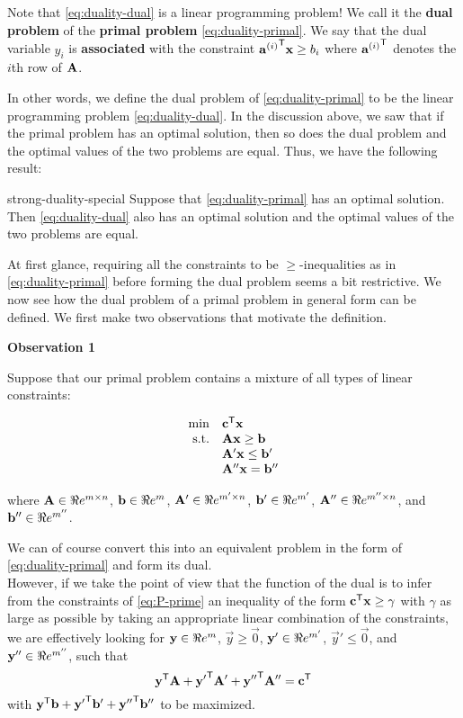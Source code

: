 Note that \eqref{eq:duality-dual} is a linear programming problem! We call
it the \textbf{dual problem} of the \textbf{primal problem}
\eqref{eq:duality-primal}. We say that the dual variable \(y_i\) is
\textbf{associated} with the constraint
\({\mathbf{a}^{(i)}}^{\mathsf{T}} \mathbf{x} \geq b_i\) where \({\mathbf{a}^{(i)}}^{\mathsf{T}}\)
denotes the \(i\)th row of \(\mathbf{A}\).

In other words, we define the dual problem of \eqref{eq:duality-primal} to
be the linear programming problem \eqref{eq:duality-dual}. In the
discussion above, we saw that if the primal problem has an optimal
solution, then so does the dual problem and the optimal values of the
two problems are equal. Thus, we have the following result:

\begin{theorem}{strong-duality-special}{}
\protect\hypertarget{thm:strong-duality-special}{}{\label{thm:strong-duality-special}}
Suppose that \eqref{eq:duality-primal} has an optimal solution. Then
\eqref{eq:duality-dual} also has an optimal solution and the optimal
values of the two problems are equal.
\end{theorem}

At first glance, requiring all the constraints to be
\(\geq\)-inequalities as in \eqref{eq:duality-primal} before forming the
dual problem seems a bit restrictive. We now see how the dual problem of
a primal problem in general form can be defined. We first make two
observations that motivate the definition.

\textbf{Observation 1}

Suppose that our primal problem contains a mixture of all types of
linear constraints:

\begin{equation}
\begin{array}{rl}
\min & \mathbf{c}^{\mathsf{T}}\mathbf{x}  \\
\mbox{s.t.} & \mathbf{A}\mathbf{x}\geq \mathbf{b} \\
& \mathbf{A'}\mathbf{x} \leq \mathbf{b'} \\
& \mathbf{A''}\mathbf{x} = \mathbf{b''}
\end{array} \label{eq:P-prime}
\end{equation}

where \(\mathbf{A} \in \Re e^{m\times n}\), \(\mathbf{b} \in \Re e^{m}\),
\(\mathbf{A}' \in \Re e^{m'\times n}\), \(\mathbf{b}' \in \Re e^{m'}\),
\(\mathbf{A}'' \in \Re e^{m''\times n}\), and \(\mathbf{b}'' \in \Re e^{m''}\).

We can of course convert this into an equivalent problem in the form of
\eqref{eq:duality-primal} and form its dual.\\
However, if we take the point of view that the function of the dual is
to infer from the constraints of \eqref{eq:P-prime} an inequality of the
form \(\mathbf{c}^{\mathsf{T}} \mathbf{x} \geq \gamma\) with \(\gamma\) as large as
possible by taking an appropriate linear combination of the constraints,
we are effectively looking for \(\mathbf{y} \in \Re e^{m}\),
\(\vec{y} \geq \vec{0}\), \(\mathbf{y}' \in \Re e^{m'}\),
\(\vec{y}' \leq \vec{0}\), and \(\mathbf{y}'' \in \Re e^{m''}\), such that
\[\mathbf{y}^{\mathsf{T}}\mathbf{A}
+\mathbf{y'}^{\mathsf{T}}\mathbf{A'}
+\mathbf{y''}^{\mathsf{T}}\mathbf{A''} = \mathbf{c}^{\mathsf{T}}\] with
\(\mathbf{y}^{\mathsf{T}}\mathbf{b} +\mathbf{y'}^{\mathsf{T}}\mathbf{b'} +\mathbf{y''}^{\mathsf{T}}\mathbf{b''}\) to be
maximized.

